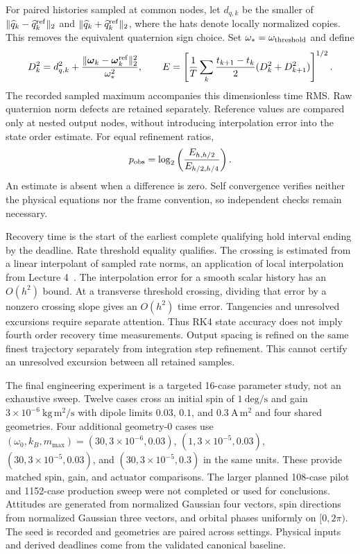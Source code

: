 For paired histories sampled at common nodes, let $d_{q,k}$ be the smaller
of $\|\widehat q_k-\widehat q^{\rm ref}_k\|_2$ and
$\|\widehat q_k+\widehat q^{\rm ref}_k\|_2$, where the hats denote locally
normalized copies. This removes the equivalent quaternion sign choice.
Set $\omega_*=\omega_{\rm threshold}$ and define
\[
 D_k^2=d_{q,k}^2+
 \frac{\|\boldsymbol\omega_k-\boldsymbol\omega_k^{\rm ref}\|_2^2}{\omega_*^2},
 \qquad
 E=\left[\frac{1}{T}\sum_k
 \frac{t_{k+1}-t_k}{2}(D_k^2+D_{k+1}^2)\right]^{1/2}.
\]
The recorded sampled maximum accompanies this dimensionless time RMS.
Raw quaternion norm defects are retained separately. Reference values are
compared only at nested output nodes, without introducing interpolation
error into the state order estimate. For equal refinement ratios,
\[
 p_{\rm obs}=\log_2\left(\frac{E_{h,h/2}}{E_{h/2,h/4}}\right).
\]
An estimate is absent when a difference is zero. Self convergence verifies
neither the physical equations nor the frame convention, so independent
checks remain necessary.

Recovery time is the start of the earliest complete qualifying hold interval
ending by the deadline. Rate threshold equality qualifies. The crossing is
estimated from a linear interpolant of sampled rate norms, an application
of local interpolation from Lecture 4~\cite{ae370lecture4}. The interpolation error for a smooth
scalar history has an $O(h^2)$ bound. At a transverse threshold crossing,
dividing that error by a nonzero crossing slope gives an $O(h^2)$ time error.
Tangencies and unresolved excursions require separate attention. Thus RK4
state accuracy does not imply fourth order recovery time measurements.
Output spacing is refined on the same finest trajectory separately from
integration step refinement. This cannot certify an unresolved excursion
between all retained samples.

The final engineering experiment is a targeted 16-case parameter study,
not an exhaustive sweep. Twelve cases cross an initial spin of
$1\ \mathrm{deg/s}$ and gain $3\times10^{-6}\ \mathrm{kg\,m^2/s}$ with
dipole limits $0.03$, $0.1$, and $0.3\ \mathrm{A\,m^2}$ and four shared
geometries. Four additional geometry-0 cases use
$(\omega_0,k_B,m_{\max})=(30,3\times10^{-6},0.03)$,
$(1,3\times10^{-5},0.03)$, $(30,3\times10^{-5},0.03)$, and
$(30,3\times10^{-5},0.3)$ in the same units. These provide matched
spin, gain, and actuator comparisons. The larger planned 108-case pilot
and 1152-case production sweep were not completed or used for conclusions.
Attitudes are generated from
normalized Gaussian four vectors, spin directions from normalized Gaussian
three vectors, and orbital phases uniformly on $[0,2\pi)$. The seed is
recorded and geometries are paired across settings. Physical inputs and
derived deadlines come from the validated canonical baseline.

